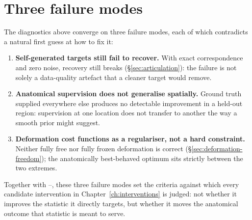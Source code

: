 \section{Three failure modes}
\label{sec:three-failure-modes}

The diagnostics above converge on three failure modes, each of which
contradicts a natural first guess at how to fix it:

\begin{enumerate}
\item \textbf{Self-generated targets still fail to recover.} With exact
correspondence and zero noise, recovery still breaks (\S\ref{sec:articulation}):
the failure is not solely a data-quality artefact that a cleaner target
would remove.
\item \textbf{Anatomical supervision does not generalise spatially.} Ground
truth supplied everywhere else produces no detectable improvement in a
held-out region: supervision at one location does not transfer to
another the way a smooth prior might suggest.
\item \textbf{Deformation cost functions as a regulariser, not a hard
constraint.} Neither fully free nor fully frozen deformation is correct
(\S\ref{sec:deformation-freedom}); the anatomically best-behaved optimum sits
strictly between the two extremes.
\end{enumerate}

Together with --, these three failure modes set the criteria
against which every candidate intervention in Chapter~\ref{ch:interventions}
is judged: not whether it improves the statistic it directly targets, but
whether it moves the anatomical outcome that statistic is meant to serve.
